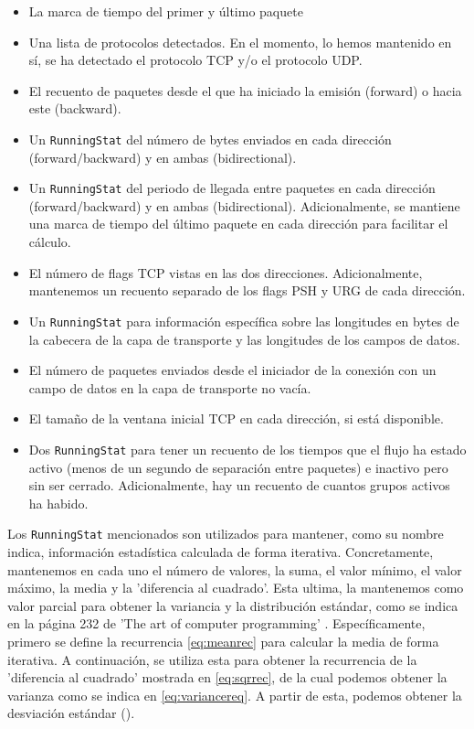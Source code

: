 \begin{itemize}
  \item La marca de tiempo del primer y último paquete
  \item Una lista de protocolos detectados. En el momento, lo hemos mantenido en sí, se ha detectado el protocolo TCP y/o el protocolo UDP.
  \item El recuento de paquetes desde el que ha iniciado la emisión (forward) o hacia este (backward).
  \item Un \texttt{RunningStat} del número de bytes enviados en cada dirección (forward/backward) y en ambas (bidirectional).
  \item Un \texttt{RunningStat} del periodo de llegada entre paquetes en cada dirección (forward/backward) y en ambas (bidirectional). Adicionalmente, se mantiene una marca de tiempo del último paquete en cada dirección para facilitar el cálculo.
  \item El número de flags TCP vistas en las dos direcciones. Adicionalmente, mantenemos un recuento separado de los flags PSH y URG de cada dirección.
  \item Un \texttt{RunningStat} para información específica sobre las longitudes en bytes de la cabecera de la capa de transporte y las longitudes de los campos de datos.
  \item El número de paquetes enviados desde el iniciador de la conexión con un campo de datos en la capa de transporte no vacía.
  \item El tamaño de la ventana inicial TCP en cada dirección, si está disponible.
  \item Dos \texttt{RunningStat} para tener un recuento de los tiempos que el flujo ha estado activo (menos de un segundo de separación entre paquetes) e inactivo pero sin ser cerrado. Adicionalmente, hay un recuento de cuantos grupos activos ha habido.
\end{itemize}

Los \texttt{RunningStat} mencionados son utilizados para mantener, como su nombre indica, información estadística calculada de forma iterativa. Concretamente, mantenemos en cada uno el número de valores, la suma, el valor mínimo, el valor máximo, la media y la 'diferencia al cuadrado'. Esta ultima, la mantenemos como valor parcial para obtener la variancia y la distribución estándar, como se indica en la página 232 de 'The art of computer programming' \cite{10.5555/270146}. Específicamente, primero se define la recurrencia \ref{eq:meanrec} para calcular la media de forma iterativa. A continuación, se utiliza esta para obtener la recurrencia de la 'diferencia al cuadrado' mostrada en \ref{eq:sqrrec}, de la cual podemos obtener la varianza como se indica en \ref{eq:variancereq}. A partir de esta, podemos obtener la desviación estándar (\sigma).

